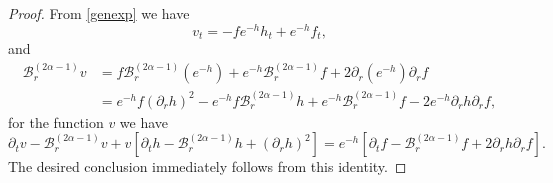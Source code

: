 \documentclass[10pt,a4paper]{amsart}
\newcommand{\Barr}{\mathscr B_r^{(2\alpha-1)}}
\newcommand{\p}{\partial}
\begin{document}
\begin{proof}
From \eqref{genexp} we have
\[
v_t = - f e^{-h} h_t + e^{-h} f_t,
\]
and
\begin{align*}
\Barr v & = f \Barr(e^{-h}) + e^{-h} \Barr f + 2 \p_r (e^{-h}) \p_r f
\\
& = e^{-h} f (\p_r h)^2 - e^{-h} f \Barr h + e^{-h} \Barr f  - 2 e^{-h} \p_r h \p_r f,
\end{align*}
for the function $v$ we have
\[
\p_t v - \Barr v + v[\p_t h - \Barr h + (\p_r h)^2] = e^{-h}[\p_t f - \Barr f + 2 \p_r h \p_r f].
\]
The desired conclusion immediately follows from this identity.

\end{proof}
\end{document}
